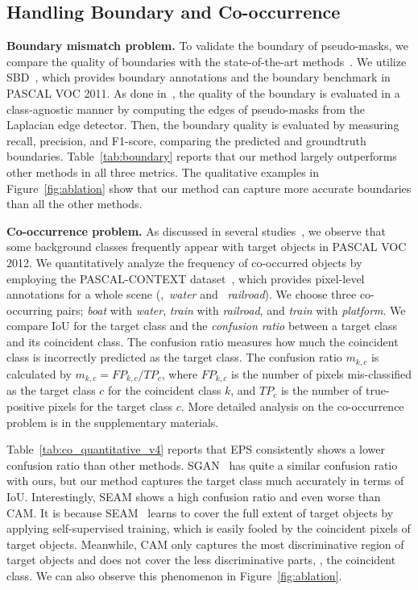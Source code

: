 \documentclass[final]{cvpr}
\begin{document}
\subsection{Handling Boundary and Co-occurrence}\label{section:5.1}

\noindent\textbf{Boundary mismatch problem.} To validate the boundary of pseudo-masks, we compare the quality of boundaries with the state-of-the-art methods~\cite{chen2020boundary, wang2020self, zhou2016learning}. We utilize SBD~\cite{hariharan2011semantic}, which provides boundary annotations and the boundary benchmark in PASCAL VOC 2011. As done in~\cite{chen2020boundary}, the quality of the boundary is evaluated in a class-agnostic manner by computing the edges of pseudo-masks from the Laplacian edge detector. Then, the boundary quality is evaluated by measuring recall, precision, and F1-score, comparing the predicted and groundtruth boundaries. Table~\ref{tab:boundary} reports that our method largely outperforms other methods in all three metrics. The qualitative examples in Figure~\ref{fig:ablation} show that our method can capture more accurate boundaries than all the other methods.




\vspace{1mm}
\noindent \textbf{Co-occurrence problem.} As discussed in several studies~\cite{huang2018weakly, kolesnikov2016seed, li2018tell, oh2017exploiting}, we observe that some background classes frequently appear with target objects in PASCAL VOC 2012. We quantitatively analyze the frequency of co-occurred objects by employing the PASCAL-CONTEXT dataset~\cite{mottaghi2014role}, which provides pixel-level annotations for a whole scene (\eg,~\emph{water} and ~\emph{railroad}). We choose three co-occurring pairs; \emph{boat} with \emph{water}, \emph{train} with \emph{railroad}, and \emph{train} with \emph{platform}. We compare IoU for the target class and the \emph{confusion ratio} between a target class and its coincident class. The confusion ratio measures how much the coincident class is incorrectly predicted as the target class. The confusion ratio $m_{k,c}$ is calculated by $m_{k,c} = FP_{k,c}/TP_{c}$, where ${FP_{k,c}}$ is the number of pixels mis-classified as the target class $c$ for the coincident class $k$, and $TP_{c}$ is the number of true-positive pixels for the target class $c$. More detailed analysis on the co-occurrence problem is in the supplementary materials.


Table~\ref{tab:co_quantitative_v4} reports that EPS consistently shows a lower confusion ratio than other methods. SGAN~\cite{yao2020saliency} has quite a similar confusion ratio with ours, but our method captures the target class much accurately in terms of IoU. Interestingly, SEAM shows a high confusion ratio and even worse than CAM. It is because SEAM~\cite{wang2020self} learns to cover the full extent of target objects by applying self-supervised training, which is easily fooled by the coincident pixels of target objects. Meanwhile, CAM only captures the most discriminative region of target objects and does not cover the less discriminative parts, \eg, the coincident class. We can also observe this phenomenon in Figure~\ref{fig:ablation}.
\end{document}
